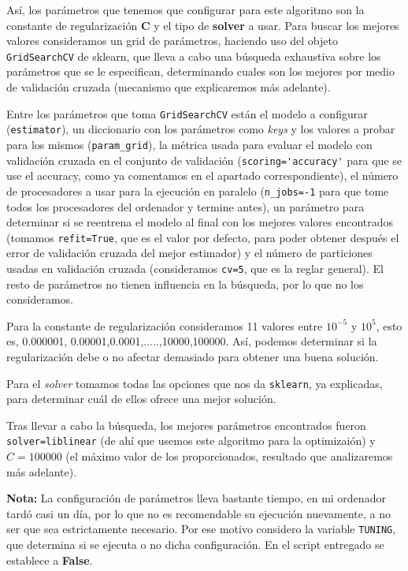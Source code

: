 \documentclass[a4]{article}
\begin{document}
Así, los parámetros que tenemos que configurar para este algoritmo son la constante de regularización \textbf{C} y el tipo de \textbf{solver} a usar. Para buscar los mejores valores consideramos un grid de parámetros, haciendo uso del objeto \lstinline|GridSearchCV| de sklearn, que lleva a cabo una búsqueda exhaustiva sobre los parámetros que se le especifican, determinando cuales son los mejores por medio de validación cruzada (mecanismo que explicaremos más adelante).

Entre los parámetros que toma \lstinline|GridSearchCV| están el modelo a configurar (\lstinline|estimator|), un diccionario con los parámetros como \textit{keys} y los valores a probar para los mismos (\lstinline|param_grid|), la métrica usada para evaluar el modelo con validación cruzada en el conjunto de validación (\lstinline|scoring='accuracy'| para que se use el accuracy, como ya comentamos en el apartado correspondiente), el número de procesadores a usar para la ejecución en paralelo (\lstinline|n_jobs=-1| para que tome todos los procesadores del ordenador y termine antes), un parámetro para determinar si se reentrena el modelo al final con los mejores valores encontrados (tomamos \lstinline|refit=True|, que es el valor por defecto, para poder obtener después el error de validación cruzada del mejor estimador) y el número de particiones usadas en validación cruzada (consideramos \lstinline|cv=5|, que es la reglar general). El resto de parámetros no tienen influencia en la búsqueda, por lo que no los consideramos. 

Para la constante de regularización consideramos 11 valores entre $10^{-5}$ y  $10^{5}$, esto es, 0.000001, 0.00001,0.0001,.....,10000,100000. Así, podemos determinar si la regularización debe o no afectar demasiado para obtener una buena solución. 

Para el \textit{solver} tomamos todas las opciones que nos da \lstinline|sklearn|, ya explicadas, para determinar cuál de ellos ofrece una mejor solución. 

Tras llevar a cabo la búsqueda, los mejores parámetros encontrados fueron \lstinline|solver=liblinear| (de ahí que usemos este algoritmo para la optimizaión) y $ C=100000 $ (el máximo valor de los proporcionados, resultado que analizaremos más adelante).

\textbf{Nota:} La configuración de parámetros lleva bastante tiempo, en mi ordenador tardó casi un día, por lo que no es recomendable su ejecución nuevamente, a no ser que sea estrictamente necesario. Por ese motivo considero la variable \lstinline|TUNING|, que determina si se ejecuta o no dicha configuración. En el script entregado se establece a \textbf{False}. 
\end{document}
